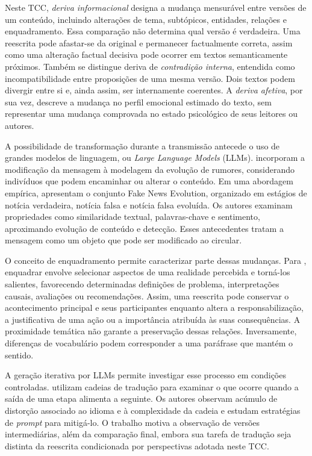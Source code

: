 Neste TCC, \emph{deriva informacional} designa a mudança mensurável entre versões de um conteúdo, incluindo alterações de tema, subtópicos, entidades, relações e enquadramento. Essa comparação não determina qual versão é verdadeira. Uma reescrita pode afastar-se da original e permanecer factualmente correta, assim como uma alteração factual decisiva pode ocorrer em textos semanticamente próximos. Também se distingue deriva de \emph{contradição interna}, entendida como incompatibilidade entre proposições de uma mesma versão. Dois textos podem divergir entre si e, ainda assim, ser internamente coerentes. A \emph{deriva afetiva}, por sua vez, descreve a mudança no perfil emocional estimado do texto, sem representar uma mudança comprovada no estado psicológico de seus leitores ou autores.

A possibilidade de transformação durante a transmissão antecede o uso de grandes modelos de linguagem, ou \textit{Large Language Models} (LLMs).  incorporam a modificação da mensagem à modelagem da evolução de rumores, considerando indivíduos que podem encaminhar ou alterar o conteúdo. Em uma abordagem empírica,  apresentam o conjunto Fake News Evolution, organizado em estágios de notícia verdadeira, notícia falsa e notícia falsa evoluída. Os autores examinam propriedades como similaridade textual, palavras-chave e sentimento, aproximando evolução de conteúdo e detecção. Esses antecedentes tratam a mensagem como um objeto que pode ser modificado ao circular.

O conceito de enquadramento permite caracterizar parte dessas mudanças. Para , enquadrar envolve selecionar aspectos de uma realidade percebida e torná-los salientes, favorecendo determinadas definições de problema, interpretações causais, avaliações ou recomendações. Assim, uma reescrita pode conservar o acontecimento principal e seus participantes enquanto altera a responsabilização, a justificativa de uma ação ou a importância atribuída às suas consequências. A proximidade temática não garante a preservação dessas relações. Inversamente, diferenças de vocabulário podem corresponder a uma paráfrase que mantém o sentido.

A geração iterativa por LLMs permite investigar esse processo em condições controladas.  utilizam cadeias de tradução para examinar o que ocorre quando a saída de uma etapa alimenta a seguinte. Os autores observam acúmulo de distorção associado ao idioma e à complexidade da cadeia e estudam estratégias de \textit{prompt} para mitigá-lo. O trabalho motiva a observação de versões intermediárias, além da comparação final, embora sua tarefa de tradução seja distinta da reescrita condicionada por perspectivas adotada neste TCC.


